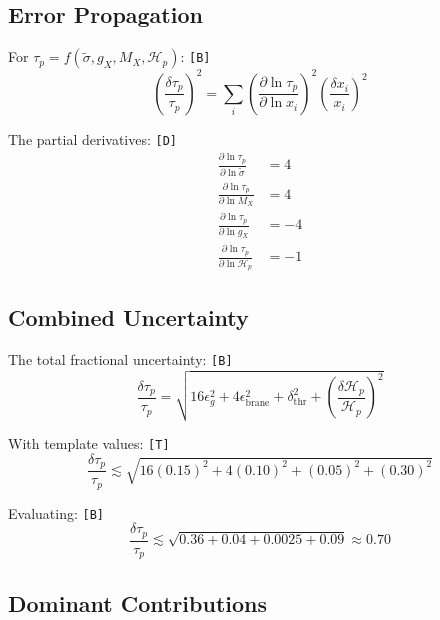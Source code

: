 \documentclass[11pt,a4paper]{article}
\newcommand{\tagD}{\textcolor{green!50!black}{\texttt{[D]}}}
\newcommand{\tagT}{\textcolor{cyan!70!black}{\texttt{[T]}}}
\newcommand{\tagB}{\textcolor{purple!70!black}{\texttt{[B]}}}
\theoremstyle{definition}
\begin{document}
\subsection{Error Propagation}
\label{subsec:error-prop}

For $\tau_p = f(\tilde{\sigma}, g_X, M_X, \mathcal{H}_p)$: \tagB{}
\begin{equation}
\label{eq:err-prop-1}
\left(\frac{\delta\tau_p}{\tau_p}\right)^2 = \sum_i \left(\frac{\partial\ln\tau_p}{\partial\ln x_i}\right)^2 \left(\frac{\delta x_i}{x_i}\right)^2
\end{equation}

The partial derivatives: \tagD{}
\begin{align}
\label{eq:partial-sigma}
\frac{\partial\ln\tau_p}{\partial\ln\tilde{\sigma}} &= 4 \\
\label{eq:partial-mx}
\frac{\partial\ln\tau_p}{\partial\ln M_X} &= 4 \\
\label{eq:partial-gx}
\frac{\partial\ln\tau_p}{\partial\ln g_X} &= -4 \\
\label{eq:partial-hp}
\frac{\partial\ln\tau_p}{\partial\ln\mathcal{H}_p} &= -1
\end{align}

\subsection{Combined Uncertainty}
\label{subsec:comb-unc}

The total fractional uncertainty: \tagB{}
\begin{equation}
\label{eq:total-unc}
\frac{\delta\tau_p}{\tau_p} = \sqrt{16\epsilon_g^2 + 4\epsilon_{\text{brane}}^2 + \delta_{\text{thr}}^2 + \left(\frac{\delta\mathcal{H}_p}{\mathcal{H}_p}\right)^2}
\end{equation}

With template values: \tagT{}
\begin{equation}
\label{eq:total-unc-num}
\frac{\delta\tau_p}{\tau_p} \lesssim \sqrt{16(0.15)^2 + 4(0.10)^2 + (0.05)^2 + (0.30)^2}
\end{equation}

Evaluating: \tagB{}
\begin{equation}
\label{eq:total-unc-eval}
\frac{\delta\tau_p}{\tau_p} \lesssim \sqrt{0.36 + 0.04 + 0.0025 + 0.09} \approx 0.70
\end{equation}

\subsection{Dominant Contributions}
\label{subsec:dominant}
\end{document}
